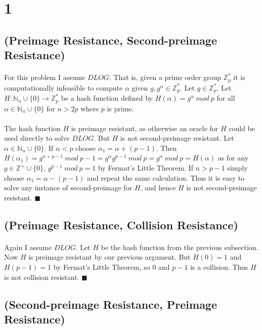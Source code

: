 \documentclass[letterpaper,12pt,oneside,onecolumn]{report}
\begin{document}
\section*{1}
\subsection*{(Preimage Resistance, Second-preimage Resistance)}
\paragraph{}
For this problem I assume $DLOG$. That is, given a prime order group $\mathbb{Z}_p^*$ it is computationally infeasible to compute $\alpha$ given $g, g^\alpha \in \mathbb{Z}_p^*$. Let $g \in \mathbb{Z}_p^*$. Let $H : \mathbb{N}_n \cup \{0\} \rightarrow \mathbb{Z}_p^*$ be a hash function defined by $H(\alpha) = g^\alpha\ mod\ p$ for all $\alpha \in \mathbb{N}_n \cup \{0\}$ for $n > 2p$ where $p$ is prime.
\paragraph{}
The hash function $H$ is preimage resistant, as otherwise an oracle for $H$ could be used directly to solve $DLOG$. But $H$ is not second-preimage resistant. Let $\alpha \in \mathbb{N}_n \cup \{0\}$. If $\alpha < p$ choose $\alpha_1 = \alpha + (p-1)$. Then $H(\alpha_1) = g^{\alpha + p-1}\ mod\ p-1 = g^\alpha g^{p-1}\ mod\ p= g^\alpha\ mod\ p = H(\alpha)$ as for any $g \in \mathbb{Z}^+ \cup \{0\}$, $g^{p-1}\ mod\ p = 1$ by Fermat's Little Theorem. If $n > p-1$ simply choose $\alpha_1 = \alpha - (p-1)$ and repeat the same calculation. Thus it is easy to solve any instance of second-preimage for $H$, and hence $H$ is not second-preimage resistant. $\blacksquare$ 
\subsection*{(Preimage Resistance, Collision Resistance)}
\paragraph{}
Again I assume $DLOG$. Let $H$ be the hash function from the previous subsection. Now $H$ is preimage resistant by our previous argument. But $H(0) = 1$ and $H(p-1) = 1$ by Fermat's Little Theorem, so $0$ and $p-1$ is a collision. Thus $H$ is not collision resistant. $\blacksquare$
\subsection*{(Second-preimage Resistance, Preimage Resistance)}
\end{document}
